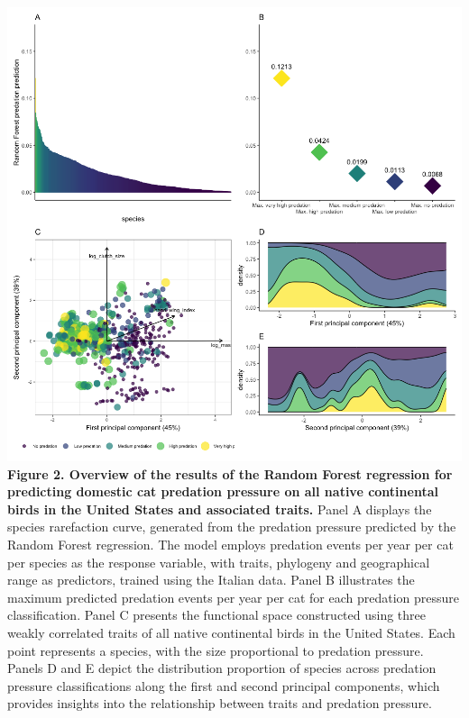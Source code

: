 \documentclass[
  super,
  review,
  3p]{elsarticle}
\begin{document}
\includegraphics{Figure2.png} \textbf{Figure 2. Overview of the results
of the Random Forest regression for predicting domestic cat predation
pressure on all native continental birds in the United States and
associated traits.} Panel A displays the species rarefaction curve,
generated from the predation pressure predicted by the Random Forest
regression. The model employs predation events per year per cat per
species as the response variable, with traits, phylogeny and
geographical range as predictors, trained using the Italian data. Panel
B illustrates the maximum predicted predation events per year per cat
for each predation pressure classification. Panel C presents the
functional space constructed using three weakly correlated traits of all
native continental birds in the United States. Each point represents a
species, with the size proportional to predation pressure. Panels D and
E depict the distribution proportion of species across predation
pressure classifications along the first and second principal
components, which provides insights into the relationship between traits
and predation pressure.
\end{document}
